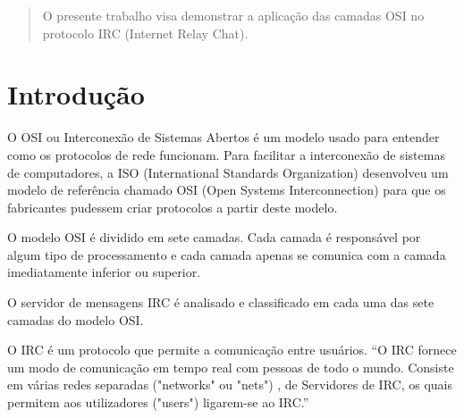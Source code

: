 \begin{abstract}

O presente trabalho visa demonstrar a aplicação das camadas OSI no protocolo IRC (Internet Relay Chat).


\end{abstract}

\newpage

\section{Introdução}

O OSI  ou Interconexão de Sistemas Abertos é um modelo usado para entender como os protocolos de rede funcionam. Para facilitar a interconexão de sistemas de computadores, a ISO (International Standards Organization) desenvolveu um modelo de referência chamado OSI (Open Systems Interconnection) para que os fabricantes pudessem criar protocolos a partir deste modelo. \cite{TORRESOSI}

O modelo OSI é dividido em sete camadas. Cada camada é responsável por algum tipo de processamento e cada camada apenas se comunica com a camada imediatamente inferior ou superior. \cite{VENTURAOSI}

O servidor de mensagens IRC é analisado e classificado em cada uma das sete camadas do modelo OSI.

O IRC é um protocolo que permite a comunicação  entre usuários. “O IRC fornece um modo de comunicação em tempo real com pessoas de todo o mundo. Consiste em várias redes separadas ("networks" ou "nets") , de Servidores de IRC, os quais permitem aos utilizadores ("users") ligarem-se ao IRC.”\cite{INTROIRC}